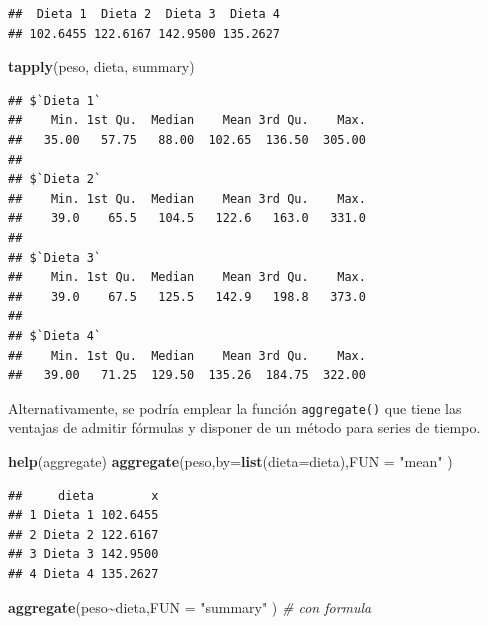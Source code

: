\documentclass[
]{book}
\newenvironment{Shaded}{\begin{snugshade}}{\end{snugshade}}
\newcommand{\AttributeTok}[1]{\textcolor[rgb]{0.13,0.29,0.53}{#1}}
\newcommand{\CommentTok}[1]{\textcolor[rgb]{0.56,0.35,0.01}{\textit{#1}}}
\newcommand{\FunctionTok}[1]{\textcolor[rgb]{0.13,0.29,0.53}{\textbf{#1}}}
\newcommand{\NormalTok}[1]{#1}
\newcommand{\SpecialCharTok}[1]{\textcolor[rgb]{0.81,0.36,0.00}{\textbf{#1}}}
\newcommand{\StringTok}[1]{\textcolor[rgb]{0.31,0.60,0.02}{#1}}
\begin{document}
\begin{verbatim}
##  Dieta 1  Dieta 2  Dieta 3  Dieta 4 
## 102.6455 122.6167 142.9500 135.2627
\end{verbatim}

\begin{Shaded}
\begin{Highlighting}[]
\FunctionTok{tapply}\NormalTok{(peso, dieta, summary)}
\end{Highlighting}
\end{Shaded}

\begin{verbatim}
## $`Dieta 1`
##    Min. 1st Qu.  Median    Mean 3rd Qu.    Max. 
##   35.00   57.75   88.00  102.65  136.50  305.00 
## 
## $`Dieta 2`
##    Min. 1st Qu.  Median    Mean 3rd Qu.    Max. 
##    39.0    65.5   104.5   122.6   163.0   331.0 
## 
## $`Dieta 3`
##    Min. 1st Qu.  Median    Mean 3rd Qu.    Max. 
##    39.0    67.5   125.5   142.9   198.8   373.0 
## 
## $`Dieta 4`
##    Min. 1st Qu.  Median    Mean 3rd Qu.    Max. 
##   39.00   71.25  129.50  135.26  184.75  322.00
\end{verbatim}

Alternativamente, se podría emplear la función \texttt{aggregate()} que tiene las ventajas de admitir fórmulas y disponer de un método para series de tiempo.

\begin{Shaded}
\begin{Highlighting}[]
\FunctionTok{help}\NormalTok{(aggregate)}
\FunctionTok{aggregate}\NormalTok{(peso,}\AttributeTok{by=}\FunctionTok{list}\NormalTok{(}\AttributeTok{dieta=}\NormalTok{dieta),}\AttributeTok{FUN =} \StringTok{"mean"}\NormalTok{ )}
\end{Highlighting}
\end{Shaded}

\begin{verbatim}
##     dieta        x
## 1 Dieta 1 102.6455
## 2 Dieta 2 122.6167
## 3 Dieta 3 142.9500
## 4 Dieta 4 135.2627
\end{verbatim}

\begin{Shaded}
\begin{Highlighting}[]
\FunctionTok{aggregate}\NormalTok{(peso}\SpecialCharTok{\textasciitilde{}}\NormalTok{dieta,}\AttributeTok{FUN =} \StringTok{"summary"}\NormalTok{ ) }\CommentTok{\# con formula}
\end{Highlighting}
\end{Shaded}
\end{document}
